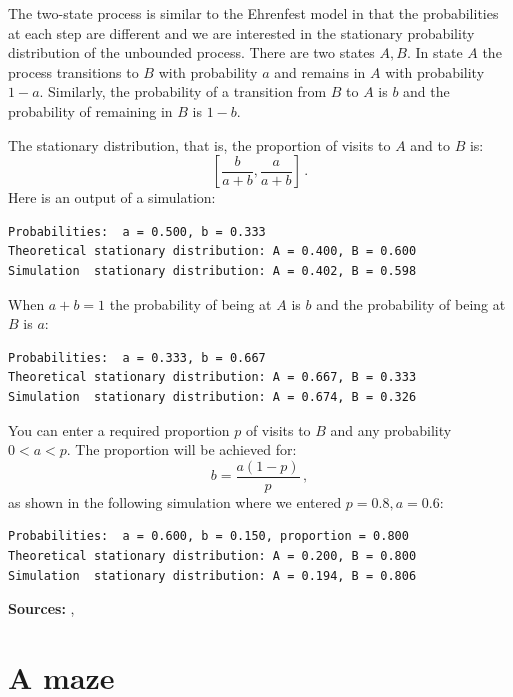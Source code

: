 \documentclass[11pt,a4paper]{article}
\begin{document}
The two-state process is similar to the Ehrenfest model in that the probabilities at each step are different and we are interested in the stationary probability distribution of the unbounded process. There are two states $A,B$. In state $A$ the process transitions to $B$  with probability $a$ and remains in $A$ with probability $1-a$. Similarly, the probability of a transition from $B$ to $A$ is $b$ and the probability of remaining in $B$ is $1-b$.
\begin{center}
\end{center}
The stationary distribution, that is, the proportion of visits to $A$ and to $B$ is:
\[
\left[\frac{b}{a+b}, \frac{a}{a+b}\right]\,.
\]
Here is an output of a simulation:
\begin{verbatim}
Probabilities:  a = 0.500, b = 0.333
Theoretical stationary distribution: A = 0.400, B = 0.600
Simulation  stationary distribution: A = 0.402, B = 0.598
\end{verbatim}
When $a+b=1$ the probability of being at $A$ is $b$ and the probability of being at $B$ is $a$:
\begin{verbatim}
Probabilities:  a = 0.333, b = 0.667
Theoretical stationary distribution: A = 0.667, B = 0.333
Simulation  stationary distribution: A = 0.674, B = 0.326
\end{verbatim}
You can enter a required proportion $p$ of visits to $B$ and any probability $0<a<p$. The proportion will be achieved for:
\[
b = \frac{a(1-p)}{p}\,,
\]
as shown in the following simulation where we entered $p=0.8, a=0.6$:
\begin{verbatim}
Probabilities:  a = 0.600, b = 0.150, proportion = 0.800
Theoretical stationary distribution: A = 0.200, B = 0.800
Simulation  stationary distribution: A = 0.194, B = 0.806
\end{verbatim}

\textbf{Sources:} \cite[Section 4.5]{privault}, \cite[Example 11.1.3]{BW}


\section{A maze}\label{maze}
\end{document}
